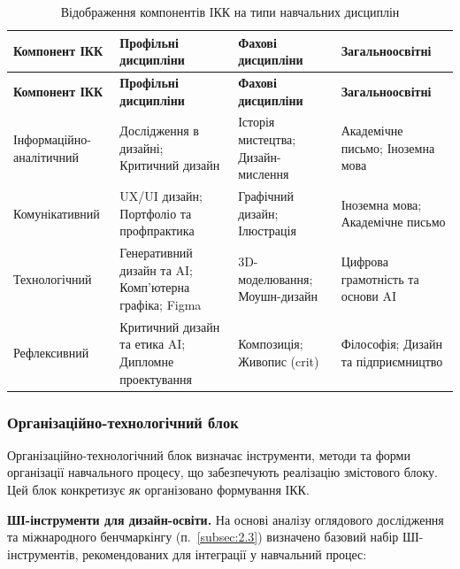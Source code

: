\begin{longtable}{@{}p{}p{}p{}p{}@{}}
\caption{Відображення компонентів ІКК на типи навчальних дисциплін}\label{tab:ikk-course-mapping} \\
\hline
\textbf{Компонент ІКК} & \textbf{Профільні дисципліни} & \textbf{Фахові дисципліни} & \textbf{Загальноосвітні} \\
\hline
\endfirsthead
\hline
\textbf{Компонент ІКК} & \textbf{Профільні дисципліни} & \textbf{Фахові дисципліни} & \textbf{Загальноосвітні} \\
\hline
\endhead
Інформаційно-аналітичний & Дослідження в дизайні; Критичний дизайн & Історія мистецтва; Дизайн-мислення & Академічне письмо; Іноземна мова \\
\addlinespace
Комунікативний & UX/UI дизайн; Портфоліо та профпрактика & Графічний дизайн; Ілюстрація & Іноземна мова; Академічне письмо \\
\addlinespace
Технологічний & Генеративний дизайн та AI; Комп'ютерна графіка; Figma & 3D-моделювання; Моушн-дизайн & Цифрова грамотність та основи AI \\
\addlinespace
Рефлексивний & Критичний дизайн та етика AI; Дипломне проектування & Композиція; Живопис (crit) & Філософія; Дизайн та підприємництво \\
\hline
\end{longtable}

\subsubsection{Організаційно-технологічний блок}\label{sssec:3.1.4}

Організаційно-технологічний блок визначає інструменти, методи та форми організації навчального процесу, що забезпечують реалізацію змістового блоку. Цей блок конкретизує \textit{як} організовано формування ІКК.

\textbf{ШІ-інструменти для дизайн-освіти.} На основі аналізу оглядового дослідження~\cite{Musiienko2026ScopingReview} та міжнародного бенчмаркінгу (п.~\ref{subsec:2.3}) визначено базовий набір ШІ-інструментів, рекомендованих для інтеграції у навчальний процес:

